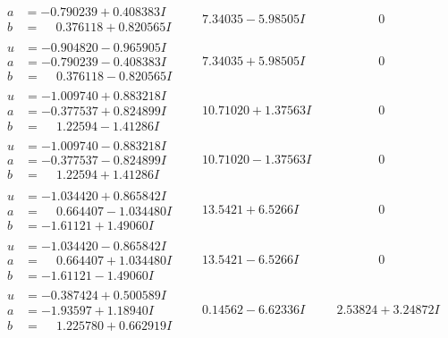 \documentclass[1p]{elsarticle_modified}
\theoremstyle{definition}
\begin{document}
$$\begin{array}{c|c|c}
\begin{aligned}
a &= -0.790239 + 0.408383 I \\
b &= \phantom{-}0.376118 + 0.820565 I\end{aligned}
 & \phantom{-}7.34035 - 5.98505 I & \phantom{-0.000000 } 0 \\ \hline\begin{aligned}
u &= -0.904820 - 0.965905 I \\
a &= -0.790239 - 0.408383 I \\
b &= \phantom{-}0.376118 - 0.820565 I\end{aligned}
 & \phantom{-}7.34035 + 5.98505 I & \phantom{-0.000000 } 0 \\ \hline\begin{aligned}
u &= -1.009740 + 0.883218 I \\
a &= -0.377537 + 0.824899 I \\
b &= \phantom{-}1.22594 - 1.41286 I\end{aligned}
 & \phantom{-}10.71020 + 1.37563 I & \phantom{-0.000000 } 0 \\ \hline\begin{aligned}
u &= -1.009740 - 0.883218 I \\
a &= -0.377537 - 0.824899 I \\
b &= \phantom{-}1.22594 + 1.41286 I\end{aligned}
 & \phantom{-}10.71020 - 1.37563 I & \phantom{-0.000000 } 0 \\ \hline\begin{aligned}
u &= -1.034420 + 0.865842 I \\
a &= \phantom{-}0.664407 - 1.034480 I \\
b &= -1.61121 + 1.49060 I\end{aligned}
 & \phantom{-}13.5421 + 6.5266 I & \phantom{-0.000000 } 0 \\ \hline\begin{aligned}
u &= -1.034420 - 0.865842 I \\
a &= \phantom{-}0.664407 + 1.034480 I \\
b &= -1.61121 - 1.49060 I\end{aligned}
 & \phantom{-}13.5421 - 6.5266 I & \phantom{-0.000000 } 0 \\ \hline\begin{aligned}
u &= -0.387424 + 0.500589 I \\
a &= -1.93597 + 1.18940 I \\
b &= \phantom{-}1.225780 + 0.662919 I\end{aligned}
 & \phantom{-}0.14562 - 6.62336 I & \phantom{-}2.53824 + 3.24872 I \\ \hline\begin{aligned}

\end{aligned}
\end{array}$$
\end{document}
